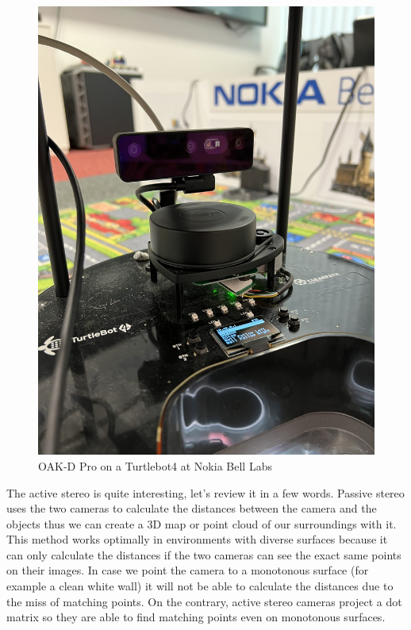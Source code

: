 \begin{figure}[H]
    \centering
    \includegraphics[width=150mm, keepaspectratio]{figures/oak_d_pro_nokia.JPEG}
    \caption{OAK-D Pro on a Turtlebot4 at Nokia Bell Labs}
    \label{fig:oak_d_pro_nokia}
\end{figure}

The active stereo\cite{Stereo} is quite interesting, let's review it in a few words. Passive stereo uses the two cameras to calculate the distances between the camera and the objects thus we can create a 3D map or point cloud of our surroundings with it. This method works optimally in environments with diverse surfaces because it can only calculate the distances if the two cameras can see the exact same points on their images. In case we point the camera to a monotonous surface (for example a clean white wall) it will not be able to calculate the distances due to the miss of matching points. On the contrary, active stereo cameras project a dot matrix so they are able to find matching points even on monotonous surfaces.

